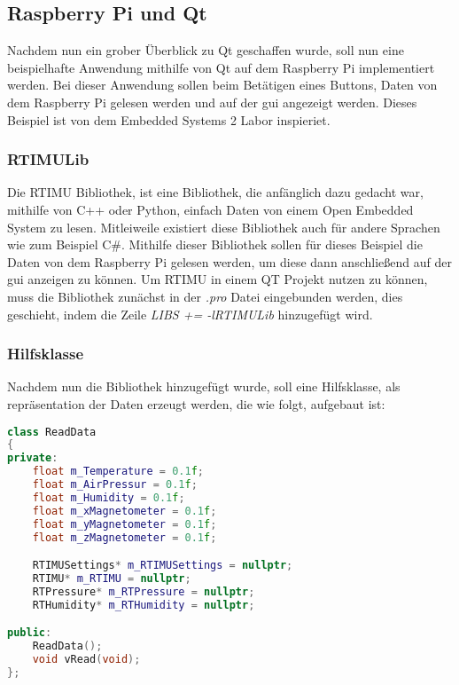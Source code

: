 \subsection{Raspberry Pi und Qt}
\label{subsec:rasPiUndQt}
Nachdem nun ein grober Überblick zu Qt geschaffen wurde, soll nun eine beispielhafte Anwendung
mithilfe von Qt auf dem Raspberry Pi implementiert werden. Bei dieser Anwendung sollen beim
Betätigen eines Buttons, Daten von dem Raspberry Pi gelesen werden und auf der \ac{gui} angezeigt
werden. Dieses Beispiel ist von dem Embedded Systems 2 Labor inspieriet.

\subsubsection{RTIMULib}
\label{subsubsec:RTIMULib}
Die RTIMU Bibliothek, ist eine Bibliothek, die anfänglich dazu gedacht war, mithilfe von C++ oder
Python, einfach Daten von einem Open Embedded System zu lesen. Mitleiweile existiert diese
Bibliothek auch für andere Sprachen wie zum Beispiel C\#.
\newline
\newline
Mithilfe dieser Bibliothek sollen für dieses Beispiel die Daten von dem Raspberry Pi gelesen
werden, um diese dann anschließend auf der \ac{gui} anzeigen zu können. Um RTIMU in einem QT
Projekt nutzen zu können, muss die Bibliothek zunächst in der \emph{.pro} Datei eingebunden
werden, dies geschieht, indem die Zeile \emph{LIBS += -lRTIMULib} hinzugefügt wird.

\subsubsection{Hilfsklasse}
\label{subsubsec:Hilfsklasse}
Nachdem nun die Bibliothek hinzugefügt wurde, soll eine Hilfsklasse, als repräsentation der Daten
erzeugt werden, die wie folgt, aufgebaut ist:

\begin{lstlisting}[language=C++, caption=RTIMU-Hilfsklasse, label=lst:Hilfsklasse]
class ReadData
{
private:
    float m_Temperature = 0.1f;
    float m_AirPressur = 0.1f;
    float m_Humidity = 0.1f;
    float m_xMagnetometer = 0.1f;
    float m_yMagnetometer = 0.1f;
    float m_zMagnetometer = 0.1f;

    RTIMUSettings* m_RTIMUSettings = nullptr;
    RTIMU* m_RTIMU = nullptr;
    RTPressure* m_RTPressure = nullptr;
    RTHumidity* m_RTHumidity = nullptr;

public:
    ReadData();
    void vRead(void);
};

\end{lstlisting}

